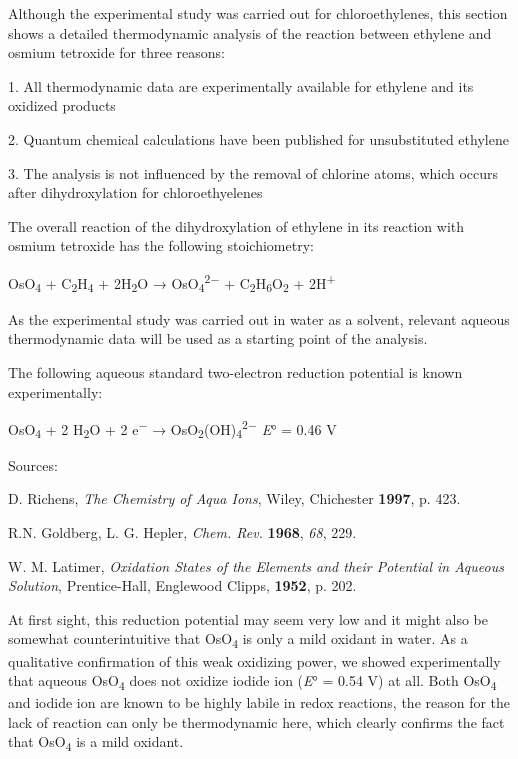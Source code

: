 \documentclass{article}
\begin{document}
Although the experimental study was carried out for chloroethylenes, this section shows a detailed thermodynamic analysis of the reaction between ethylene and osmium tetroxide for three reasons:

\begin{hangpars}
1. All thermodynamic data are experimentally available for ethylene and its oxidized products

2. Quantum chemical calculations have been published for unsubstituted ethylene

3. The analysis is not influenced by the removal of chlorine atoms, which occurs after dihydroxylation for chloroethyelenes
\end{hangpars}

The overall reaction of the dihydroxylation of ethylene in its reaction with osmium tetroxide has the following stoichiometry:

\begin{center}
OsO\textsubscript{4} + C\textsubscript{2}H\textsubscript{4} + 2H\textsubscript{2}O → OsO\textsubscript{4}\textsuperscript{2−} + C\textsubscript{2}H\textsubscript{6}O\textsubscript{2} + 2H\textsuperscript{+}
\end{center}

As the experimental study was carried out in water as a solvent, relevant aqueous thermodynamic data will be used as a starting point of the analysis.

The following aqueous standard two-electron reduction potential is known experimentally:

\begin{center}
OsO\textsubscript{4} + 2 H\textsubscript{2}O + 2 e\textsuperscript{−} → OsO\textsubscript{2}(OH)\textsubscript{4}\textsuperscript{2−} \qquad \emph{E}° = 0.46 V
\end{center}

\noindent Sources:

D. Richens, \emph{The Chemistry of Aqua Ions}, Wiley, Chichester \textbf{1997}, p. 423.

R.N. Goldberg, L. G. Hepler, \emph{Chem. Rev.} \textbf{1968}, \emph{68}, 229.

W. M. Latimer, \emph{Oxidation States of the Elements and their Potential in Aqueous Solution}, Prentice-Hall, Englewood Clipps, \textbf{1952}, p. 202.

At first sight, this reduction potential may seem very low and it might also be somewhat counterintuitive that OsO\textsubscript{4} is only a mild oxidant in water. As a qualitative confirmation of this weak oxidizing power, we showed experimentally that aqueous OsO\textsubscript{4} does not oxidize iodide ion (\emph{E}° = 0.54 V) at all. Both OsO\textsubscript{4} and iodide ion are known to be highly labile in redox reactions, the reason for the lack of reaction can only be thermodynamic here, which clearly confirms the fact that OsO\textsubscript{4} is a mild oxidant.
\end{document}
